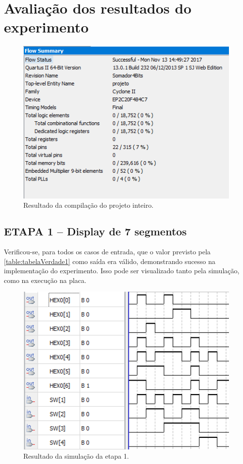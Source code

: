 \chapter{Avaliação dos resultados do experimento}
	\begin{figure}[H]
		\centering
		\caption{\label{fig:compilacao}Resultado da compilação do projeto inteiro.}
		\includegraphics[width=1\textwidth]{img/compilacao}
	\end{figure}

	\section{ETAPA 1 – Display de 7 segmentos}

		Verificou-se, para todos os casos de entrada, que o valor previsto pela \autoref{table:tabelaVerdade1}
		como saída era válido, demonstrando sucesso na implementação do experimento. Isso pode
		ser visualizado tanto pela simulação, como na execução na placa.

		\begin{figure}[H]
		    \centering
			\caption{\label{fig:etapa1Simulacao}Resultado da simulação da etapa 1.}
			\includegraphics[width=1\textwidth]{img/etapa1/SimulacaoSegmentos7}
		\end{figure}

